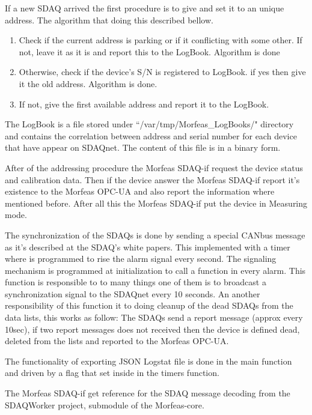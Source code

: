 If a new SDAQ arrived the first procedure is to give and set it to an unique address. The algorithm that doing this described bellow.
\begin{enumerate}
	\item Check if the current address is parking or if it conflicting with some other. If not, leave it as it is and report this to the LogBook. Algorithm is done
	\item Otherwise, check if the device's S/N is registered to LogBook. if yes then give it the old address. Algorithm is done.
	\item If not, give the first available address and report it to the LogBook.
\end{enumerate}
The LogBook is a file stored under ``/var/tmp/Morfeas\_LogBooks/" directory and contains the correlation between address and serial number for each device that have appear on SDAQnet.
The content of this file is in a binary form.

After of the addressing procedure the Morfeas SDAQ-if request the device status and calibration data. Then if the device answer the Morfeas SDAQ-if report it's existence to the Morfeas OPC-UA
and also report the information where mentioned before. After all this the Morfeas SDAQ-if put the device in Measuring mode.

The synchronization of the SDAQs is done by sending a special CANbus message as it's described at the SDAQ's white papers. This implemented with a timer where is programmed to rise the alarm signal every second.
The signaling mechanism is programmed at initialization to call a function in every alarm. This function is responsible to to many things one of them is to broadcast a synchronization signal to the SDAQnet every 10 seconds.
An another responsibility of this function it to doing cleanup of the dead SDAQs from the data lists, this works as follow: The SDAQs send a report message (approx every 10sec),
if two report messages does not received then the device is defined dead, deleted from the lists and reported to the Morfeas OPC-UA.

The functionality of exporting JSON Logstat file is done in the main function and driven by a flag that set inside in the timers function.

The Morfeas SDAQ-if get reference for the SDAQ message decoding from the SDAQWorker project, submodule of the Morfeas-core.